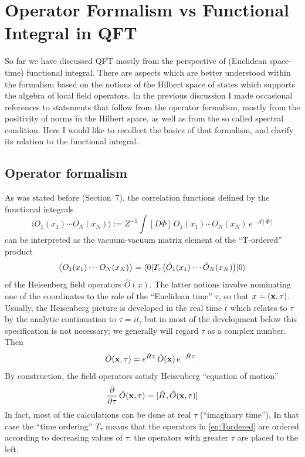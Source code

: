 \section{Operator Formalism vs Functional Integral in QFT}

So far we have discussed QFT mostly from the perspective of (Euclidean space-time)
functional integral. There are aspects which are better understood within the
formalism based on the notions of the Hilbert space of states which supports the
algebra of local field operators. In the previous discussion I made occasional
references to statements that follow from the operator formalism, mostly from the
positivity of norms in the Hilbert space, as well as from the so called spectral
condition. Here I would like to recollect the basics of that formalism, and
clarify its relation to the functional integral.

\subsection*{Operator formalism}

As was stated before (Section~7), the correlation functions defined by the
functional integrals
\begin{equation}\label{eq:corrPhi}
\bigl\langle O_1(x_1)\cdots O_N(x_N)\bigr\rangle:=Z^{-1}\int[D\Phi]\,O_1(x_1)\cdots O_N(x_N)\,e^{-\mathcal A[\Phi]}
\end{equation}
can be interpreted as the vacuum-vacuum matrix element of the ``T-ordered'' product
\begin{equation}\label{eq:Tordered}
\bigl\langle O_1(x_1)\cdots O_N(x_N)\bigr\rangle=\langle 0|T_\tau\bigl(\hat O_1(x_1)\cdots\hat O_N(x_N)\bigr)|0\rangle
\end{equation}
of the Heisenberg field operators $\hat O(x)$. The latter notions involve
nominating one of the coordinates to the role of the ``Euclidean time'' $\tau$, so
that $x=(\mathbf{x},\tau)$. Usually, the Heisenberg picture is developed in the real time
$t$ which relates to $\tau$ by the analytic continuation to $\tau=it$, but in most
of the development below this specification is not necessary; we generally will
regard $\tau$ as a complex number. Then
\begin{equation}\label{eq:Heis}
\hat O(\mathbf{x},\tau)=e^{\hat H\tau}\,\hat O(\mathbf{x})\,e^{-\hat H\tau}\,.
\end{equation}
By construction, the field operators satisfy Heisenberg ``equation of motion''
\begin{equation}\label{eq:HeisEOM}
\frac\partial{\partial\tau}\,\hat O(\mathbf{x},\tau)=[\hat H,\hat O(\mathbf{x},\tau)]
\end{equation}
In fact, most of the calculations can be done at real $\tau$ (``imaginary time'').
In that case the ``time ordering'' $T_\tau$ means that the operators in
\eqref{eq:Tordered} are ordered according to decreasing values of $\tau$: the
operators with greater $\tau$ are placed to the left.

